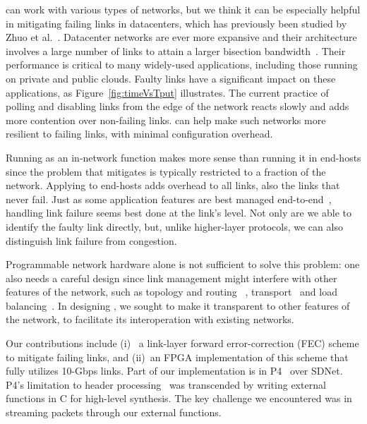 \OurSys can work with various types of networks, but we think it can be
especially helpful in mitigating failing links in datacenters, which has
previously been studied by Zhuo et al.~\cite{Zhuo:2017:UMP:3098822.3098849}.
Datacenter networks are ever more expansive and their architecture involves a
large number of links to attain a larger bisection bandwidth~\cite{Singh:2016:JRD:2991470.2975159}. Their
performance is critical to many widely-used applications, including those
running on private and public clouds. Faulty  links have a significant impact
on these applications, as Figure~\ref{fig:timeVsTput}  illustrates. The
current practice of polling and disabling links from the edge of the network
reacts slowly and adds more contention over non-failing links. \OurSys can help
make such networks more resilient to failing links, with minimal configuration
overhead.

Running \OurSys as an in-network function makes more sense than
running it in end-hosts since the problem that \OurSys mitigates is
typically restricted to a fraction of the network.  Applying \OurSys to
end-hosts adds overhead to all links, also the links that never fail.
Just as some application features are
best managed end-to-end~\cite{Saltzer84end-to-endarguments}, handling
link failure seems best done at the link's level. Not only are we able to
identify the faulty link directly, but, unlike higher-layer protocols,
we can also distinguish link failure from congestion.

Programmable network hardware alone is not sufficient to solve this problem: one
also needs a careful design since link management might interfere with
other features of the network, such as topology and routing~
\cite{Greenberg:2011:VSF:1897852.1897877},
transport~\cite{Raiciu:2011:IDP:2043164.2018467} %
and load balancing~\cite{Alizadeh:2014:CDC:2740070.2626316}.
In designing \OurSys, we sought to make it transparent to other
features of the network, to facilitate its interoperation with
existing networks.

Our contributions include (i)~
a link-layer forward error-correction (FEC) scheme to mitigate failing
links, and (ii)~an FPGA implementation of this scheme that fully utilizes 10-Gbps
links. Part of our implementation is in
P4~\cite{Bosshart:2014:PPP:2656877.2656890} over SDNet.
P4's limitation to header processing~\cite{Dang:2017:WPL:3050220.3050231}
was transcended by writing external functions in C for high-level synthesis.
The key challenge we encountered was in streaming packets through our
external functions.%

